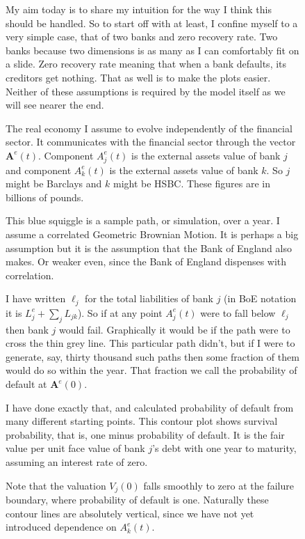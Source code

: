 \documentclass[a4paper,11pt]{article}
\newcommand{\ass}[2]{A^{e}_{#1}(#2)}
\newcommand{\vass}[1]{\boldsymbol{A}^{e}(#1)}
\newcommand{\lia}[1]{\ell_{#1}}
\newcommand{\val}[2]{V_{#1}(#2)}
\begin{document}
  \begin{figure}[H]
    \begin{center}
    \end{center}
    \ttfamily
    My aim today is to share my intuition for the way I think this should be handled.
    So to start off with at least, I confine myself to a very simple case, that of two banks and zero recovery rate.
    Two banks because two dimensions is as many as I can comfortably fit on a slide.
    Zero recovery rate meaning that when a bank defaults, its creditors get nothing.
    That as well is to make the plots easier.
    Neither of these assumptions is required by the model itself as we will see nearer the end.
  \end{figure}
  \begin{figure}[H]
    \begin{center}
    \end{center}
    \ttfamily
    The real economy I assume to evolve independently of the financial sector.
    It communicates with the financial sector through the vector $\vass{t}$.
    Component $\ass{j}{t}$ is the external assets value of bank $j$ and component $\ass{k}{t}$ is the external assets value of bank $k$.
    So $j$ might be Barclays and $k$ might be HSBC. These figures are in billions of pounds.

    This blue squiggle is a sample path, or simulation, over a year. I assume a correlated Geometric Brownian Motion.
    It is perhaps a big assumption but it is the assumption that the Bank of England also makes.
    Or weaker even, since the Bank of England dispenses with correlation.

    I have written $\lia{j}$ for the total liabilities of bank $j$
    (in BoE notation it is $L^{e}_{j}+\sum_{j}L_{jk}$).
    So if at any point $\ass{j}{t}$ were to fall below $\lia{j}$ then bank $j$ would fail.
    Graphically it would be if the path were to cross the thin grey line.
    This particular path didn't, but if I were to generate, say, thirty thousand such paths then some fraction of them would do so within the year.
    That fraction we call the probability of default at $\vass{0}$.
  \end{figure}
  \begin{figure}[H]
    \begin{center}
    \end{center}
    \ttfamily
    I have done exactly that, and calculated probability of default from many different starting points.
    This contour plot shows survival probability, that is, one minus probability of default.
    It is the fair value per unit face value of bank $j$'s debt with one year to maturity,
    assuming an interest rate of zero.

    Note that the valuation $\val{j}{0}$ falls smoothly to zero at the failure boundary,
    where probability of default is one. Naturally these contour lines are absolutely vertical,
    since we have not yet introduced dependence on $\ass{k}{t}$.
  \end{figure}
\end{document}
